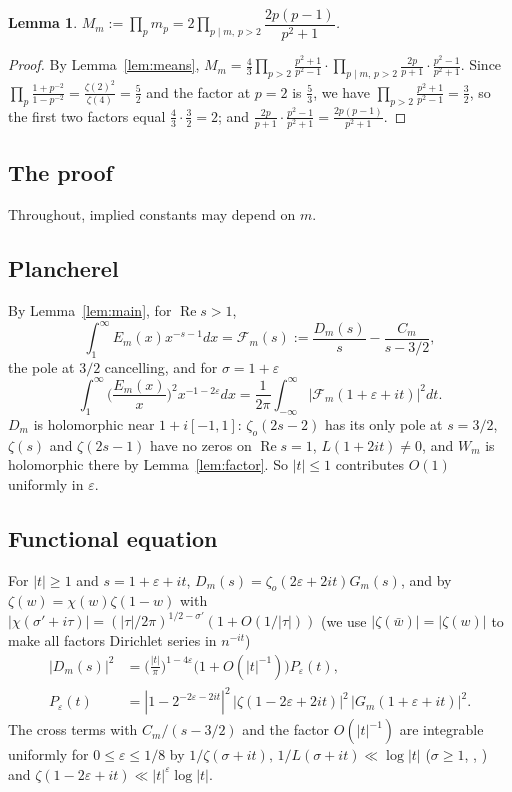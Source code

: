 \documentclass[11pt]{amsart}
\newtheorem{lemma}{Lemma}
\theoremstyle{remark}
\newcommand{\zo}{\zeta_{o}}
\begin{document}
\begin{lemma}\label{lem:M}
$M_m:=\prod_pm_p=2\prod_{p\mid m,\,p>2}\dfrac{2p(p-1)}{p^2+1}$.
\end{lemma}

\begin{proof}
By Lemma~\ref{lem:means}, $M_m=\frac43\prod_{p>2}\frac{p^2+1}{p^2-1}\cdot\prod_{p\mid m,\,p>2}\frac{2p}{p+1}\cdot\frac{p^2-1}{p^2+1}$. Since $\prod_p\frac{1+p^{-2}}{1-p^{-2}}=\frac{\zeta(2)^2}{\zeta(4)}=\frac52$ and the factor at $p=2$ is $\frac53$, we have $\prod_{p>2}\frac{p^2+1}{p^2-1}=\frac32$, so the first two factors equal $\frac43\cdot\frac32=2$; and $\frac{2p}{p+1}\cdot\frac{p^2-1}{p^2+1}=\frac{2p(p-1)}{p^2+1}$.
\end{proof}

\subsection{The proof}
Throughout, implied constants may depend on $m$.

\subsection{Plancherel}
By Lemma~\ref{lem:main}, for $\operatorname{Re}s>1$,
\[
\int_1^\infty E_m(x)x^{-s-1}dx=\mathcal F_m(s):=\frac{D_m(s)}{s}-\frac{C_m}{s-3/2},
\]
the pole at $3/2$ cancelling, and for $\sigma=1+\varepsilon$
\begin{equation}\label{eq:planch}
\int_1^\infty\Big(\frac{E_m(x)}x\Big)^2x^{-1-2\varepsilon}dx=\frac1{2\pi}\int_{-\infty}^{\infty}|\mathcal F_m(1+\varepsilon+it)|^2dt.
\end{equation}
$D_m$ is holomorphic near $1+i[-1,1]$: $\zo(2s-2)$ has its only pole at $s=3/2$, $\zeta(s)$ and $\zeta(2s-1)$ have no zeros on $\operatorname{Re}s=1$, $L(1+2it)\ne0$, and $W_m$ is holomorphic there by Lemma~\ref{lem:factor}. So $|t|\le1$ contributes $O(1)$ uniformly in $\varepsilon$.

\subsection{Functional equation}\label{sec:fe}
For $|t|\ge1$ and $s=1+\varepsilon+it$, $D_m(s)=\zo(2\varepsilon+2it)G_m(s)$, and by $\zeta(w)=\chi(w)\zeta(1-w)$ with $|\chi(\sigma'+i\tau)|=(|\tau|/2\pi)^{1/2-\sigma'}(1+O(1/|\tau|))$ \cite[\S4.12]{T} (we use $|\zeta(\bar w)|=|\zeta(w)|$ to make all factors Dirichlet series in $n^{-it}$)
\begin{align*}
|D_m(s)|^2&=\Big(\frac{|t|}\pi\Big)^{1-4\varepsilon}\big(1+O(|t|^{-1})\big)P_\varepsilon(t),\\
P_\varepsilon(t)&=|1-2^{-2\varepsilon-2it}|^2\,|\zeta(1-2\varepsilon+2it)|^2\,|G_m(1+\varepsilon+it)|^2.
\end{align*}
The cross terms with $C_m/(s-3/2)$ and the factor $O(|t|^{-1})$ are integrable uniformly for $0\le\varepsilon\le1/8$ by $1/\zeta(\sigma+it),\,1/L(\sigma+it)\ll\log|t|$ ($\sigma\ge1$, \cite[\S3.6]{T}, \cite[Thm.~11.4]{MVb}) and $\zeta(1-2\varepsilon+it)\ll|t|^{\varepsilon}\log|t|$.
\end{document}
